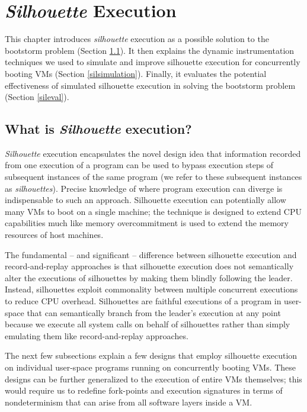 \chapter{{\em Silhouette} Execution}
This chapter introduces {\em silhouette} 
execution as a possible solution to the bootstorm
problem (Section \ref{def:sil}).
It then explains the dynamic instrumentation 
techniques we used to simulate and improve silhouette execution
for concurrently booting VMs (Section \ref{silsimulation}). Finally,
it evaluates the potential effectiveness
of simulated silhouette execution in solving the 
bootstorm problem (Section \ref{sileval}). 

\section{What is {\em Silhouette} execution?} \label{def:sil}
{\em Silhouette} execution encapsulates the 
novel design idea that information recorded from one
execution of a program can be used to 
bypass execution steps of subsequent instances
of the same program (we refer to these
subsequent instances as {\em silhouettes}). Precise knowledge
of where program execution can diverge 
is indispensable to such an approach.
Silhouette execution can potentially
allow many VMs to boot on a single
machine; the technique is designed to 
extend CPU capabilities much like
memory overcommitment is used to extend
the memory resources of host machines.

The fundamental -- and significant -- difference
between silhouette execution and record-and-replay
approaches is that silhouette execution
does not semantically alter the executions
of silhouettes by making them blindly following
the leader. Instead, silhouettes exploit commonality 
between multiple concurrent executions to reduce CPU 
overhead. Silhouettes are faithful executions of a program
in user-space that can semantically branch from the 
leader's execution at any point because we execute all system calls
on behalf of silhouettes rather than simply emulating them
like record-and-replay approaches.

The next few subsections explain a few
designs that employ silhouette execution
on individual user-space programs
running on concurrently booting VMs.
These designs can be further generalized to the execution of entire
VMs themselves; this would require us to redefine fork-points
and execution signatures in terms of nondeterminism that can
arise from all software layers inside a VM.

